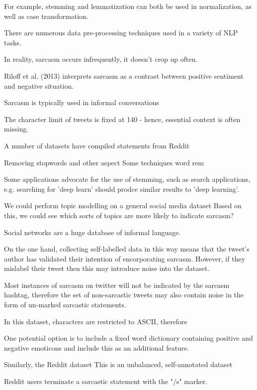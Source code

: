 \documentclass[12pt,a4paper]{article}
\begin{document}
For example, stemming and lemmatization can both be used in normalization, as well as case transformation.

There are numerous data pre-processing techniques used in a variety of NLP tasks.


In reality, sarcasm occurs infrequently, it doesn't crop up often. 


Riloff et al. (2013) interprets sarcasm as a contrast between positive sentiment and negative situation.


Sarcasm is typically used in informal conversations



The character limit of tweets is fixed at 140 - hence, essential context is often missing. 


A number of datasets have compiled statements from Reddit \cite{wallace2014humans,khodak2017large}

Removing stopwords and other aspect
Some techniques word rem

Some applications advocate for the use of stemming, such as search applications, e.g. searching for 'deep learn' should prodce similar results to 'deep learning'. 

We could perform topic modelling on a general social media dataset
Based on this, we could see which sorts of topics are more likely to indicate sarcasm?



Social networks are a huge database of informal language. 


On the one hand, collecting self-labelled data in this way means that the tweet's author has validated their intention of encorporating sarcasm. However, if they mislabel their tweet then this may introduce noise into the dataset. 

Most instances of sarcasm on twitter will not be indicated by the sarcasm hashtag, therefore the set of non-sarcastic tweets may also contain noise in the form of un-marked sarcastic statements.

In this dataset, characters are restricted to ASCII, therefore 

One potential option is to include a fixed word dictionary containing positive and negative emoticons and include this as an additional feature.




Similarly, the Reddit dataset \cite{khodak2017large} 
This is an unbalanced, self-annotated dataset

Reddit users terminate a sarcastic statement with the "/s" marker. 
\end{document}
